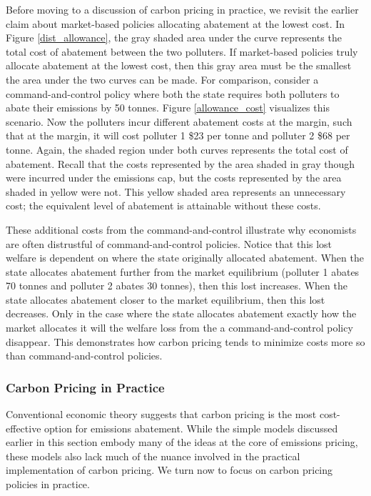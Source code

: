 Before moving to a discussion of carbon pricing in practice, we revisit the earlier claim about market-based policies allocating abatement at the lowest cost. In Figure \ref{dist_allowance}, the gray shaded area under the curve represents the total cost of abatement between the two polluters. If market-based policies truly allocate abatement at the lowest cost, then this gray area must be the smallest the area under the two curves can be made. For comparison, consider a command-and-control policy where both the state requires both polluters to abate their emissions by 50 tonnes. Figure \ref{allowance_cost} visualizes this scenario. Now the polluters incur different abatement costs at the margin, such that at the margin, it will cost polluter 1 \$23 per tonne and polluter 2 \$68 per tonne. Again, the shaded region under both curves represents the total cost of abatement. Recall that the costs represented by the area shaded in gray though were incurred under the emissions cap, but the costs represented by the area shaded in yellow were not. This yellow shaded area represents an unnecessary cost; the equivalent level of abatement is attainable without these costs. 

These additional costs from the command-and-control illustrate why economists are often distrustful of command-and-control policies. Notice that this lost welfare is dependent on where the state originally allocated abatement. When the state allocates abatement further from the market equilibrium (polluter 1 abates 70 tonnes and polluter 2 abates 30 tonnes), then this lost increases. When the state allocates abatement closer to the market equilibrium, then this lost decreases. Only in the case where the state allocates abatement exactly how the market allocates it will the welfare loss from the a command-and-control policy disappear. This demonstrates how carbon pricing tends to minimize costs more so than command-and-control policies.


\subsubsection{Carbon Pricing in Practice}

Conventional economic theory suggests that carbon pricing is the most  cost-effective option for emissions abatement. While the simple models discussed earlier in this section embody many of the ideas at the core of emissions pricing, these models also lack much of the nuance involved in the practical implementation of carbon pricing. We turn now to focus on carbon pricing policies in practice. 


